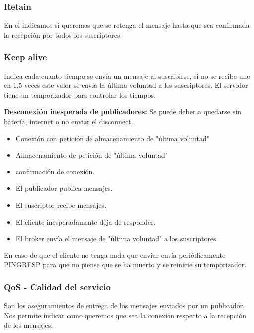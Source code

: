 \documentclass[12pt]{report} %
\begin{document}
\subsubsection{Retain} 
En el indicamos si queremos que se retenga el mensaje hasta que sea confirmada la recepción por todos los suscriptores.

\subsubsection{Keep alive} 
Indica cada cuanto tiempo se envía un mensaje al suscribirse, si no se recibe uno en 1,5 veces este valor se envía la última voluntad a los suscriptores. El servidor tiene un temporizador para controlar los tiempos.

\textbf{Desconexión inesperada de publicadores:} Se puede deber a quedarse sin batería, internet o no enviar el disconnect. 
\begin{itemize}
	\item Conexión con petición de almacenamiento de "última voluntad"
	\item Almacenamiento de petición de "última voluntad"
	\item confirmación de conexión.
	\item El publicador publica mensajes.
	\item El suscriptor recibe mensajes.
	\item El cliente inesperadamente deja de responder.
	\item El broker envía el mensaje de "última voluntad" a los suscriptores.
\end{itemize}
En caso de que el cliente no tenga nada que enviar envía periódicamente PINGRESP para que no piense que se ha muerto y se reinicie su temporizador.


\subsubsection{QoS - Calidad del servicio}
Son los aseguramientos de entrega de los mensajes enviados por un publicador. Nos permite indicar como queremos que sea la conexión respecto a la recepción de los mensajes.
\end{document}
